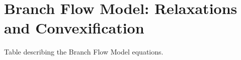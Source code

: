 \chapter{Branch Flow Model: Relaxations and Convexification}

\begin{table}[!h]
	\caption{Table describing the Branch Flow Model equations.}
	\label{tab:bfm1}
	\centering
	\hspace*{-2cm}
	
\end{table}